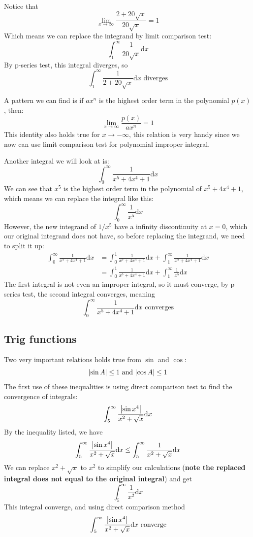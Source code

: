 \documentclass{article}
\begin{document}
Notice that 
\[
    \lim_{x\to \infty} \frac{2+20\sqrt{x}}{20\sqrt{x}} = 1
\]
Which means we can replace the integrand by limit comparison test:
\[
    \int_{1}^{\infty} \frac{1}{20\sqrt{x}} \mathrm{d}x
\]
By p-series test, this integral diverges, so 
\[
    \int_{1}^{\infty} \frac{1}{2+20\sqrt{x}}\mathrm{d}x \text{ diverges}
\]

A pattern we can find is if $ax^n$ is the highest order term in the polynomial $p(x)$, then:
\[
    \lim_{x\to \infty} \frac{p(x)}{ax^n} = 1
\]
This identity also holds true for $x\to -\infty$, this relation is very handy since we now can use limit comparison test for polynomial improper integral.

Another integral we will look at is:
\[
    \int_{0}^{\infty} \frac{1}{x^5+4x^4+1}\mathrm{d}x
\]
We can see that $x^{5}$ is the highest order term in the polynomial of $x^5+4x^4+1$, which means we can replace the integral like this:
\[
    \int_{0}^{\infty} \frac{1}{x^5}\mathrm{d}x
\]
However, the new integrand of $1/x^5$ have a infinity discontinuity at $x=0$, which our original integrand does not have, so before replacing the integrand, we need to split it up:
\[
\begin{split}
    \int_{0}^{\infty} \frac{1}{x^5+4x^4+1}\mathrm{d}x & = \int_{0}^{1} \frac{1}{x^5+4x^4+1}\mathrm{d}x + \int_{1}^{\infty} \frac{1}{x^5+4x^4+1}\mathrm{d}x\\
    & = \int_{0}^{1} \frac{1}{x^5+4x^4+1}\mathrm{d}x + \int_{1}^{\infty} \frac{1}{x^5} \mathrm{d}x
\end{split}
\]
The first integral is not even an improper integral, so it must converge, by p-series test, the second integral converges, meaning 
\[
    \int_{0}^{\infty} \frac{1}{x^5+4x^4+1}\mathrm{d}x \text{ converges}
\]

\newpage
\subsection{Trig functions}
Two very important relations holds true from $\sin$ and $\cos$:
\[
    \abs{\sin A}\leq 1 \text{ and } \abs{\cos A} \leq 1
\]
The first use of these inequalities is using direct comparison test to find the convergence of integrals:
\[
    \int_{5}^{\infty} \frac{\abs{\sin x^4}}{x^2 + \sqrt{x}} \mathrm{d} x
\]
By the inequality listed, we have 
\[
    \int_{5}^{\infty} \frac{\abs{\sin x^4}}{x^2 + \sqrt{x}} \mathrm{d} x \leq \int_{5}^{\infty} \frac{1}{x^2 + \sqrt{x}} \mathrm{d} x
\]
We can replace $x^2+\sqrt{x}$ to $x^2$ to simplify our calculations (\textbf{note the replaced integral does not equal to the original integral}) and get
\[
    \int_{5}^{\infty} \frac{1}{x^2} \mathrm{d}x
\]
This integral converge, and using direct comparison method
\[
    \int_{5}^{\infty} \frac{\abs{\sin x^4}}{x^2 + \sqrt{x}} \mathrm{d} x \text{ converge}
\]
\end{document}
